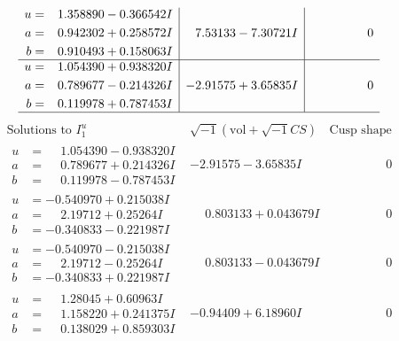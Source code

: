\documentclass[1p]{elsarticle_modified}
\theoremstyle{definition}
\newcommand{\I}{\sqrt{-1}}
\begin{document}
$$\begin{array}{c|c|c}
\begin{aligned}
u &= \phantom{-}1.358890 - 0.366542 I \\
a &= \phantom{-}0.942302 + 0.258572 I \\
b &= \phantom{-}0.910493 + 0.158063 I\end{aligned}
 & \phantom{-}7.53133 - 7.30721 I & \phantom{-0.000000 } 0 \\ \hline\begin{aligned}
u &= \phantom{-}1.054390 + 0.938320 I \\
a &= \phantom{-}0.789677 - 0.214326 I \\
b &= \phantom{-}0.119978 + 0.787453 I\end{aligned}
 & -2.91575 + 3.65835 I & \phantom{-0.000000 } 0\\
 \hline 
 \end{array}$$\newpage$$\begin{array}{c|c|c}  
\text{Solutions to }I^u_{1}& \I (\text{vol} + \sqrt{-1}CS) & \text{Cusp shape}\\
 \hline 
\begin{aligned}
u &= \phantom{-}1.054390 - 0.938320 I \\
a &= \phantom{-}0.789677 + 0.214326 I \\
b &= \phantom{-}0.119978 - 0.787453 I\end{aligned}
 & -2.91575 - 3.65835 I & \phantom{-0.000000 } 0 \\ \hline\begin{aligned}
u &= -0.540970 + 0.215038 I \\
a &= \phantom{-}2.19712 + 0.25264 I \\
b &= -0.340833 - 0.221987 I\end{aligned}
 & \phantom{-}0.803133 + 0.043679 I & \phantom{-0.000000 } 0 \\ \hline\begin{aligned}
u &= -0.540970 - 0.215038 I \\
a &= \phantom{-}2.19712 - 0.25264 I \\
b &= -0.340833 + 0.221987 I\end{aligned}
 & \phantom{-}0.803133 - 0.043679 I & \phantom{-0.000000 } 0 \\ \hline\begin{aligned}
u &= \phantom{-}1.28045 + 0.60963 I \\
a &= \phantom{-}1.158220 + 0.241375 I \\
b &= \phantom{-}0.138029 + 0.859303 I\end{aligned}
 & -0.94409 + 6.18960 I & \phantom{-0.000000 } 0 \\ \hline\begin{aligned}

\end{aligned}
\end{array}$$
\end{document}
